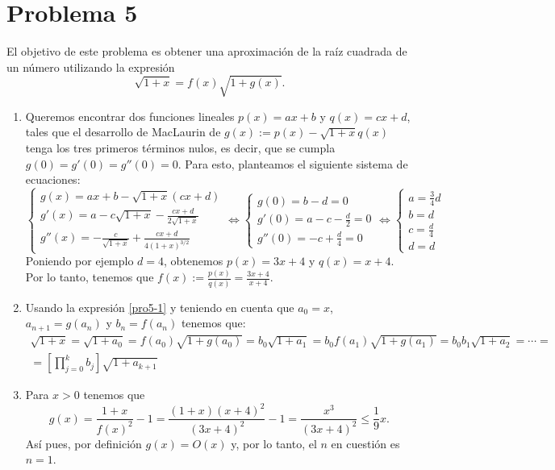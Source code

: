 \documentclass[a4paper]{article}
\begin{document}
\section*{Problema 5}
El objetivo de este problema es obtener una aproximación de la raíz cuadrada de un número utilizando la expresión
\begin{equation}
    \sqrt{1+x}=f(x)\sqrt{1+g(x)}.
    \label{pro5-1}
\end{equation}
\begin{enumerate}
\renewcommand{\labelenumi}{(\alph{enumi})}
    \item Queremos encontrar dos funciones lineales $p(x)=ax+b$ y $q(x)=cx+d$, tales que el desarrollo de MacLaurin de $g(x):=p(x)-\sqrt{1+x}q(x)$ tenga los tres primeros términos nulos, es decir, que se cumpla $g(0)=g'(0)=g''(0)=0$. Para esto, planteamos el siguiente sistema de ecuaciones:
    $$\left\{\begin{array}{l}
        g(x)=ax+b-\sqrt{1+x}(cx+d)  \\
        g'(x)=a-c\sqrt{1+x}-\frac{cx+d}{2\sqrt{1+x}}  \\
        g''(x)=-\frac{c}{\sqrt{1+x}}+\frac{cx+d}{4(1+x)^{3/2}} 
    \end{array}\right.\iff\left\{\begin{array}{l}
        g(0)=b-d=0  \\
        g'(0)=a-c-\frac{d}{2}=0  \\
        g''(0)=-c+\frac{d}{4}=0
    \end{array}\right.\iff\left\{\begin{array}{l}
        a=\frac{3}{4}d  \\
        b=d  \\
        c=\frac{d}{4} \\
        d=d
    \end{array}\right.$$
    Poniendo por ejemplo $d=4$, obtenemos $p(x)=3x+4$ y $q(x)=x+4$. Por lo tanto, tenemos que $f(x):=\frac{p(x)}{q(x)}=\frac{3x+4}{x+4}$.
    \item Usando la expresión \eqref{pro5-1} y teniendo en cuenta que $a_0=x$, $a_{n+1}=g(a_n)$ y $b_n=f(a_n)$ tenemos que: 
    \begin{multline}
        \sqrt{1+x}=\sqrt{1+a_0}=f(a_0)\sqrt{1+g(a_0)}=b_0\sqrt{1+a_1}=b_0f(a_1)\sqrt{1+g(a_1)}=b_0b_1\sqrt{1+a_2}=\cdots=\\=\left[\prod_{j=0}^kb_j\right]\sqrt{1+a_{k+1}}
        \label{pro5-2}
    \end{multline}
    \setcounter{enumi}{3}
    \item Para $x>0$ tenemos que $$g(x)=\frac{1+x}{f(x)^2}-1=\frac{(1+x)(x+4)^2}{(3x+4)^2}-1=\frac{x^3}{(3x+4)^2}\leq\frac{1}{9}x.$$ Así pues, por definición $g(x)=O(x)$ y, por lo tanto, el $n$ en cuestión es $n=1$.

\end{enumerate}
\end{document}

